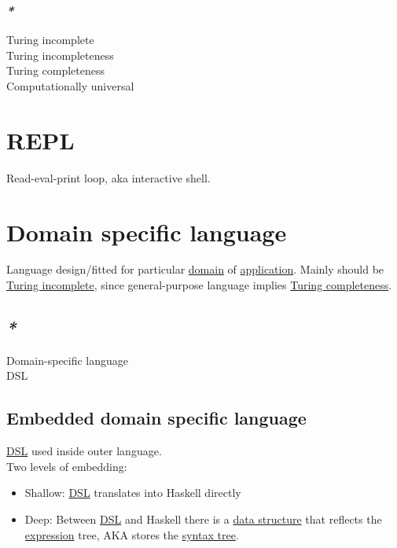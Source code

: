 \documentclass[a4paper,14pt,oneside]{book}
\begin{document}
{\subsubsection{\emph{*}}
\label{sec:org39f9af9}

\label{orgfe56b02}Turing incomplete\\
\label{org6637e7c}Turing incompleteness\\
\label{org178be7d}Turing completeness\\
\label{org1362c97}Computationally universal\\

\section{\label{orge24d392}REPL}
\label{sec:org8cf4baa}
Read-eval-print loop, aka interactive shell.\\

\section{\label{orgc6fb0fb}Domain specific language}
\label{sec:org09b7165}
Language design/fitted for particular \hyperref[org17b9ae1]{domain} of \hyperref[org623a42d]{application}. Mainly should be \hyperref[orgfe56b02]{Turing incomplete}, since general-purpose language implies \hyperref[org178be7d]{Turing completeness}.\\

\subsection{\emph{*}}
\label{sec:org327eed7}

\label{orgfdb7134}Domain-specific language\\
\label{org6c3d96a}DSL\\

\subsection{\label{org44b19c3}Embedded domain specific language}
\label{sec:org9f13cdb}

\hyperref[org6c3d96a]{DSL} used inside outer language.\\

Two levels of embedding:\\

\begin{itemize}
\item Shallow: \hyperref[org6c3d96a]{DSL} translates into Haskell directly\\
\item Deep: Between \hyperref[org6c3d96a]{DSL} and Haskell there is a \hyperref[orgbe03dd5]{data structure} that reflects the \hyperref[org4f4ad69]{expression} tree, AKA stores the \hyperref[org13352c5]{syntax tree}.\\
\end{itemize}

}
\end{document}
